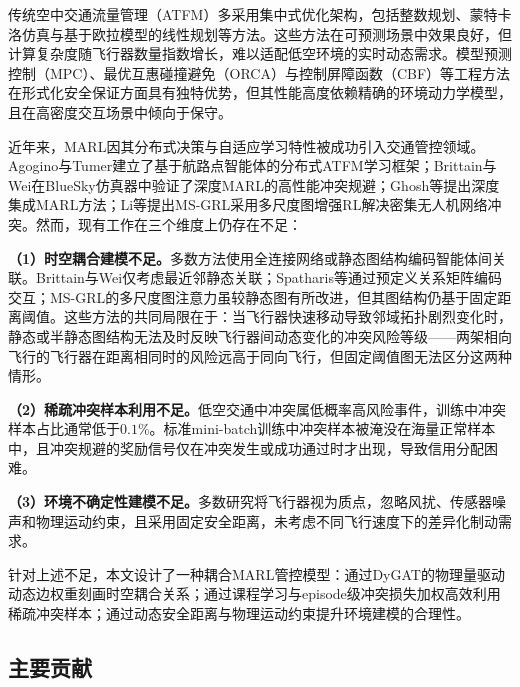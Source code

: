 \documentclass[12pt,a4paper,UTF8]{ctexart}
\begin{document}
传统空中交通流量管理（ATFM）多采用集中式优化架构，包括整数规划、蒙特卡洛仿真与基于欧拉模型的线性规划等方法\cite{ref2}。这些方法在可预测场景中效果良好，但计算复杂度随飞行器数量指数增长，难以适配低空环境的实时动态需求。模型预测控制（MPC）\cite{ref3}、最优互惠碰撞避免（ORCA）\cite{ref4}与控制屏障函数（CBF）\cite{ref5}等工程方法在形式化安全保证方面具有独特优势，但其性能高度依赖精确的环境动力学模型，且在高密度交互场景中倾向于保守。

近年来，MARL因其分布式决策与自适应学习特性被成功引入交通管控领域。Agogino与Tumer\cite{ref6,ref7}建立了基于航路点智能体的分布式ATFM学习框架；Brittain与Wei\cite{ref8}在BlueSky仿真器中验证了深度MARL的高性能冲突规避；Ghosh等\cite{ref9}提出深度集成MARL方法；Li等\cite{ref10}提出MS-GRL采用多尺度图增强RL解决密集无人机网络冲突。然而，现有工作在三个维度上仍存在不足：

\textbf{（1）时空耦合建模不足。}多数方法使用全连接网络或静态图结构编码智能体间关联。Brittain与Wei\cite{ref8}仅考虑最近邻静态关联；Spatharis等\cite{ref11}通过预定义关系矩阵编码交互；MS-GRL\cite{ref10}的多尺度图注意力虽较静态图有所改进，但其图结构仍基于固定距离阈值。这些方法的共同局限在于：当飞行器快速移动导致邻域拓扑剧烈变化时，静态或半静态图结构无法及时反映飞行器间动态变化的冲突风险等级——两架相向飞行的飞行器在距离相同时的风险远高于同向飞行，但固定阈值图无法区分这两种情形。

\textbf{（2）稀疏冲突样本利用不足。}低空交通中冲突属低概率高风险事件，训练中冲突样本占比通常低于$0.1\%$\cite{ref12,ref13}。标准mini-batch训练中冲突样本被淹没在海量正常样本中，且冲突规避的奖励信号仅在冲突发生或成功通过时才出现，导致信用分配困难。

\textbf{（3）环境不确定性建模不足。}多数研究将飞行器视为质点，忽略风扰、传感器噪声和物理运动约束\cite{ref11}，且采用固定安全距离，未考虑不同飞行速度下的差异化制动需求。

针对上述不足，本文设计了一种耦合MARL管控模型：通过DyGAT的物理量驱动动态边权重刻画时空耦合关系；通过课程学习与episode级冲突损失加权高效利用稀疏冲突样本；通过动态安全距离与物理运动约束提升环境建模的合理性。

\subsection{主要贡献}
\end{document}
